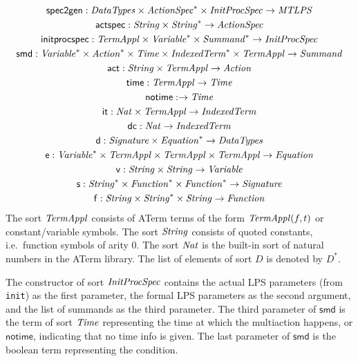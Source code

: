 \documentclass[fleqn,a4paper]{article}
\newcommand{\aterm}[1]{\mathsf{#1}}
\newcommand{\afunc}[3]{\aterm{#1}:#2\rightarrow#3}
\begin{document}
\begin{gather*}
\afunc{spec2gen}{\nm{DataTypes}\x\nm{ActionSpec}^*\x\nm{InitProcSpec}}{\nm{MTLPS}}\\
\afunc{actspec}{\nm{String}\x\nm{String}^*}{\nm{ActionSpec}}\\
\afunc{initprocspec}{\nm{TermAppl}\x\nm{Variable}^*\x\nm{Summand}^*}{\nm{InitProcSpec}}\\
\afunc{smd}{\nm{Variable}^*\x\nm{Action}^*\x\nm{Time}\x\nm{IndexedTerm}^*\x\nm{TermAppl}}{\nm{Summand}}\\
\afunc{act}{\nm{String}\x\nm{TermAppl}}{\nm{Action}}\\
\afunc{time}{\nm{TermAppl}}{\nm{Time}}\\
\afunc{notime}{}{\nm{Time}}\\
\afunc{it}{\Nat\x\nm{TermAppl}}{\nm{IndexedTerm}}\\
\afunc{dc}{\Nat}{\nm{IndexedTerm}}\\
\afunc{d}{\nm{Signature}\x\nm{Equation}^*}{\nm{DataTypes}}\\
\afunc{e}{\nm{Variable}^*\x\nm{TermAppl}\x\nm{TermAppl}\x\nm{TermAppl}}{\nm{Equation}}\\
\afunc{v}{\nm{String}\x\nm{String}}{\nm{Variable}}\\
\afunc{s}{\nm{String}^*\x\nm{Function}^*\x\nm{Function}^*}{\nm{Signature}}\\
\afunc{f}{\nm{String}\x\nm{String}^{*}\x\nm{String}}{\nm{Function}}
\end{gather*}
The sort $\mathit{TermAppl}$ consists of ATerm terms of the form
$\mathit{TermAppl}(f,t)$ or constant/variable symbols. The sort
$\mathit{String}$ consists of quoted constants, i.e.\ function symbols of
arity 0. The sort $\mathit{Nat}$ is the built-in sort of natural numbers in
the ATerm library. The list of elements of sort $D$ is denoted by
$D^{*}$.

The constructor of sort $\mathit{InitProcSpec}$ contains the actual LPS
parameters (from \texttt{init}) as the first parameter, the formal LPS
parameters as the second argument, and the list of summands as the
third parameter. The third parameter of $\mathsf{smd}$ is the term of
sort $\mathit{Time}$ representing the time at which the multiaction
happens, or $\mathsf{notime}$, indicating that no time info is given.
The last parameter of $\mathsf{smd}$ is the boolean term representing
the condition.
\end{document}
